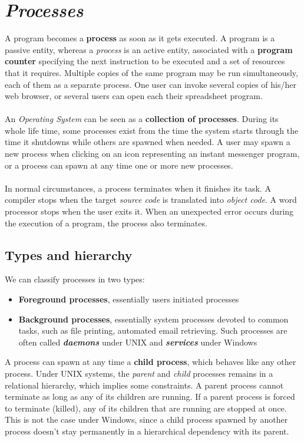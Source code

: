 \documentclass[11pt,a4paper]{scrreprt}
\begin{document}
\section{\textit{Processes}}
A program becomes a \textbf{process} as soon as it gets executed. A program is a passive entity, whereas a \textit{process} is an active entity, associated with a \textbf{program counter} specifying the next instruction to be executed and a set of resources that it requires. Multiple copies of the same program may be run simultaneously, each of them as a separate process. One user can invoke several copies of his/her web browser, or several users can open each their spreadsheet program. \\\\
An \textit{Operating System} can be seen as a \textbf{collection of processes}. During its whole life time, some processes exist from the time the system starts through the time it shutdowns while others are spawned when needed. A user may spawn a new process when clicking on an icon representing an instant messenger program, or a process can spawn at any time one or more new processes. \\\\
In normal circumstances, a process terminates when it finishes its task. A compiler stops when the target \textit{source code} is translated into \textit{object code}. A word processor stops when the user exits it. When an unexpected error occurs during the execution of a program, the process also terminates.

\subsection{Types and hierarchy}
We can classify processes in two types:
\begin{itemize}
\item \textbf{Foreground processes}, essentially users initiated processes
\item \textbf{Background processes}, essentially system processes devoted to common tasks, such as file printing, automated email retrieving. Such processes are often called \textbf{\textit{daemons}} under UNIX and \textbf{\textit{services}} under Windows
\end{itemize}
A process can spawn at any time a \textbf{child process}, which behaves like any other process. Under UNIX systems, the \textit{parent} and \textit{child} processes remains in a relational hierarchy, which implies some constraints. A parent process cannot terminate as long as any of its children are running. If a parent process is forced to terminate (killed), any of its children that are running are stopped at once. This is not the case under Windows, since a child process spawned by another process doesn't stay permanently in a hierarchical dependency with its parent.
\end{document}
